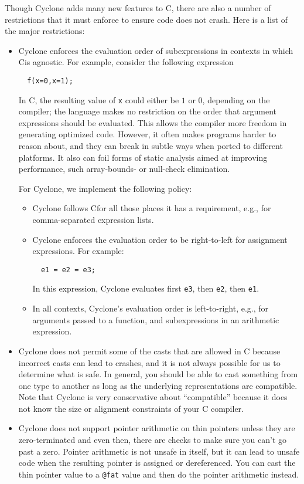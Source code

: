 Though Cyclone adds many new features to C, there are also a number
of restrictions that it must enforce to ensure code does not crash.
Here is a list of the major restrictions:
\begin{itemize}
\item Cyclone enforces the evaluation order of subexpressions in contexts
  in which C\@ is agnostic.  For example, consider the following expression
\begin{verbatim}
  f(x=0,x=1);
\end{verbatim}
  In C\@, the resulting value of \texttt{x} could either be $1$ or $0$,
  depending on the compiler; the language makes no restriction on
  the order that argument expressions should be evaluated.  This allows
  the compiler more freedom in generating optimized code.  However, it
  often makes programs harder to reason about, and they can break in
  subtle ways when ported to different platforms.  It also can foil forms
  of static analysis aimed at improving performance, such array-bounds-
  or null-check elimination.

  For Cyclone, we implement the following policy:
\begin{itemize}
\item Cyclone follows C\@ for all those places it has a requirement, e.g., for
  comma-separated expression lists.
\item Cyclone enforces the evaluation order to be right-to-left for assignment
  expressions.  For example:
\begin{verbatim}
  e1 = e2 = e3;
\end{verbatim}
  In this expression, Cyclone evaluates first \texttt{e3}, then \texttt{e2},
  then \texttt{e1}.
\item In all contexts, Cyclone's evaluation order is left-to-right, e.g.,
  for arguments passed to a function, and subexpressions in an arithmetic
  expression.
\end{itemize}

\item Cyclone does not permit some of the casts that are allowed in C because
  incorrect casts can lead to crashes, and it is not always possible
  for us to determine what is safe.  In general, you should be
  able to cast something from one type to another as long as the
  underlying representations are compatible.  Note that Cyclone is
  very conservative about ``compatible'' because it does not know
  the size or alignment constraints of your C compiler.  

\item Cyclone does not support pointer arithmetic on thin
  pointers unless they are zero-terminated and even then,
  there are checks to make sure you can't go past a zero.  Pointer 
  arithmetic is not unsafe in itself, but
  it can lead to unsafe code when the resulting pointer is assigned or
  dereferenced.  You can cast the thin pointer value to a
  \texttt{@fat} value and then do the pointer arithmetic instead.


\end{itemize}
